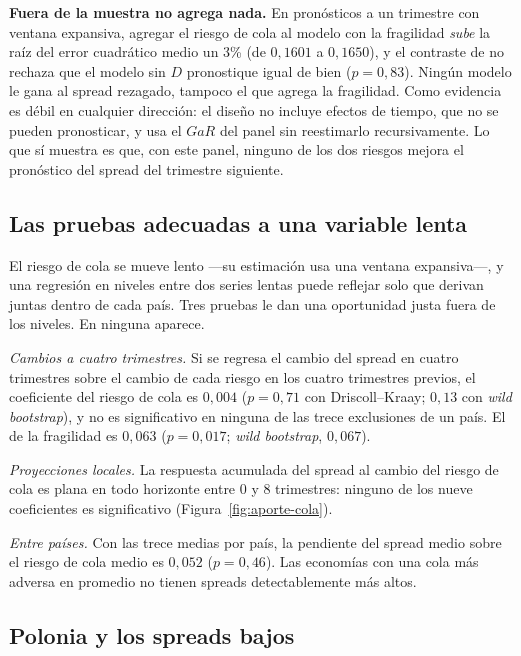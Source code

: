 \textbf{Fuera de la muestra no agrega nada.} En pronósticos a un trimestre con ventana expansiva, agregar el riesgo de cola al modelo con la fragilidad \emph{sube} la raíz del error cuadrático medio un 3\% (de $0{,}1601$ a $0{,}1650$), y el contraste de \citet{ClarkWest2007} no rechaza que el modelo sin $D$ pronostique igual de bien ($p=0{,}83$). Ningún modelo le gana al spread rezagado, tampoco el que agrega la fragilidad. Como evidencia es débil en cualquier dirección: el diseño no incluye efectos de tiempo, que no se pueden pronosticar, y usa el $GaR$ del panel sin reestimarlo recursivamente. Lo que sí muestra es que, con este panel, ninguno de los dos riesgos mejora el pronóstico del spread del trimestre siguiente.

\subsection{Las pruebas adecuadas a una variable lenta}

El riesgo de cola se mueve lento ---su estimación usa una ventana expansiva---, y una regresión en niveles entre dos series lentas puede reflejar solo que derivan juntas dentro de cada país. Tres pruebas le dan una oportunidad justa fuera de los niveles. En ninguna aparece.


\emph{Cambios a cuatro trimestres.} Si se regresa el cambio del spread en cuatro trimestres sobre el cambio de cada riesgo en los cuatro trimestres previos, el coeficiente del riesgo de cola es $0{,}004$ ($p=0{,}71$ con Driscoll--Kraay; $0{,}13$ con \textit{wild bootstrap}), y no es significativo en ninguna de las trece exclusiones de un país. El de la fragilidad es $0{,}063$ ($p=0{,}017$; \textit{wild bootstrap}, $0{,}067$).

\emph{Proyecciones locales.} La respuesta acumulada del spread al cambio del riesgo de cola es plana en todo horizonte entre 0 y 8 trimestres: ninguno de los nueve coeficientes es significativo (Figura~\ref{fig:aporte-cola}).

\emph{Entre países.} Con las trece medias por país, la pendiente del spread medio sobre el riesgo de cola medio es $0{,}052$ ($p=0{,}46$). Las economías con una cola más adversa en promedio no tienen spreads detectablemente más altos.

\subsection{Polonia y los spreads bajos}

